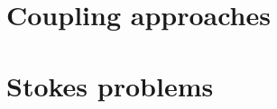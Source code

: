 \documentclass{beamer}
\begin{document}
\section{Coupling approaches}





% 

% 
% 

\section{Stokes problems}





\end{document}
